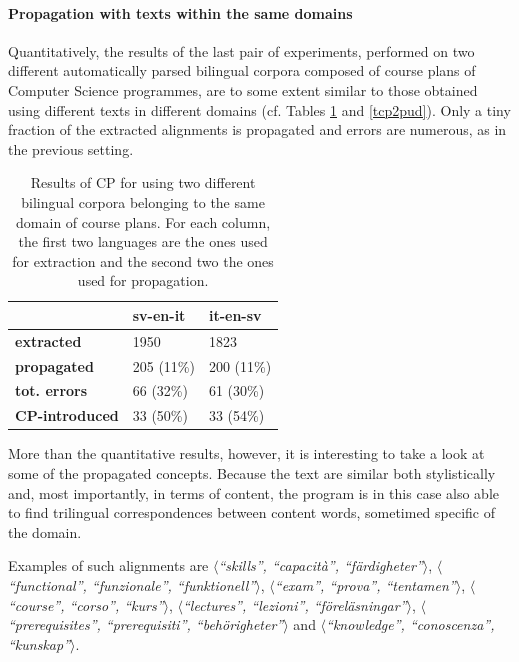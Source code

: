 \paragraph{Propagation with texts within the same domains}

Quantitatively, the results of the last pair of experiments, performed on two different automatically parsed bilingual corpora composed of course plans of Computer Science programmes, are to some extent similar to those obtained using different texts in different domains (cf. Tables \ref{tcp2courses} and \ref{tcp2pud}). Only a tiny fraction of the extracted alignments is propagated and errors are numerous, as in the previous setting. 

\begin{table}[H]
    \centering
    \begin{tabular}{|l|l|l|}
    \hline
                           & \textbf{sv-en-it} & \textbf{it-en-sv} \\ \hline
    \textbf{extracted}     & 1950              & 1823              \\ \hline
    \textbf{propagated}             & 205 (11\%)     & 200 (11\%)     \\ \hline
    \textbf{tot. errors}            & 66 (32\%)      & 61 (30\%)       \\ \hline
    \textbf{CP-introduced} & 33 (50\%)        & 33 (54\%)      \\ \hline
    \end{tabular}
    \caption[Performance of CP Scenario 2 on automatically parsed homogeneous data]{Results of CP for using two different bilingual corpora belonging to the same domain of course plans. For each column, the first two languages are the ones used for extraction and the second two the ones used for propagation.}
    \label{tcp2courses}
    \end{table}

    More than the quantitative results, however, it is interesting to take a look at some of the propagated concepts. Because the text are similar both stylistically and, most importantly, in terms of content, the program is in this case also able to find trilingual correspondences between content words, sometimed specific of the domain. 
    
    Examples of such alignments are $\langle$\textit{``skills'', ``capacità'', ``färdigheter''}$\rangle$, $\langle$\textit{``functional'', ``funzionale'', ``funktionell''}$\rangle$, $\langle$\textit{``exam'', ``prova'', ``tentamen''}$\rangle$, $\langle$\textit{``course'', ``corso'', ``kurs''}$\rangle$, $\langle$\textit{``lectures'', ``lezioni'', ``föreläsningar''}$\rangle$, $\langle$\textit{``prerequisites'', ``prerequisiti'', ``behörigheter''}$\rangle$ and $\langle$\textit{``knowledge'', ``conoscenza'', ``kunskap''}$\rangle$. \smallskip

